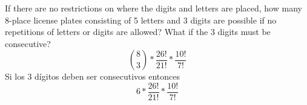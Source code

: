 \item If there are no restrictions on where the digits and letters are placed, how many 8-place license plates consisting of 5 letters and 3 digits are possible if no repetitions of letters or digits are allowed? What if the 3 digits must be consecutive?
\[ \binom{8}{3} * \frac{26!}{21!} * \frac{10!}{7!} \]
Si los 3 dígitos deben ser consecutivos entonces
\[ 6 * \frac{26!}{21!} * \frac{10!}{7!} \]